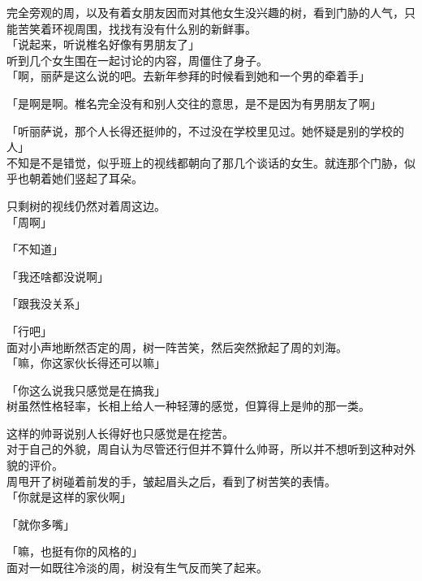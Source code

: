 完全旁观的周，以及有着女朋友因而对其他女生没兴趣的树，看到门胁的人气，只能苦笑着环视周围，找找有没有什么别的新鲜事。\\

「说起来，听说椎名好像有男朋友了」\\

听到几个女生围在一起讨论的内容，周僵住了身子。\\

「啊，丽萨是这么说的吧。去新年参拜的时候看到她和一个男的牵着手」

「是啊是啊。椎名完全没有和别人交往的意思，是不是因为有男朋友了啊」

「听丽萨说，那个人长得还挺帅的，不过没在学校里见过。她怀疑是别的学校的人」\\

不知是不是错觉，似乎班上的视线都朝向了那几个谈话的女生。就连那个门胁，似乎也朝着她们竖起了耳朵。

只剩树的视线仍然对着周这边。\\

「周啊」

「不知道」

「我还啥都没说啊」

「跟我没关系」

「行吧」\\

面对小声地断然否定的周，树一阵苦笑，然后突然掀起了周的刘海。\\

「嘛，你这家伙长得还可以嘛」

「你这么说我只感觉是在搞我」\\

树虽然性格轻率，长相上给人一种轻薄的感觉，但算得上是帅的那一类。

这样的帅哥说别人长得好也只感觉是在挖苦。\\

对于自己的外貌，周自认为尽管还行但并不算什么帅哥，所以并不想听到这种对外貌的评价。\\

周甩开了树碰着前发的手，皱起眉头之后，看到了树苦笑的表情。\\

「你就是这样的家伙啊」

「就你多嘴」

「嘛，也挺有你的风格的」\\

面对一如既往冷淡的周，树没有生气反而笑了起来。\\

